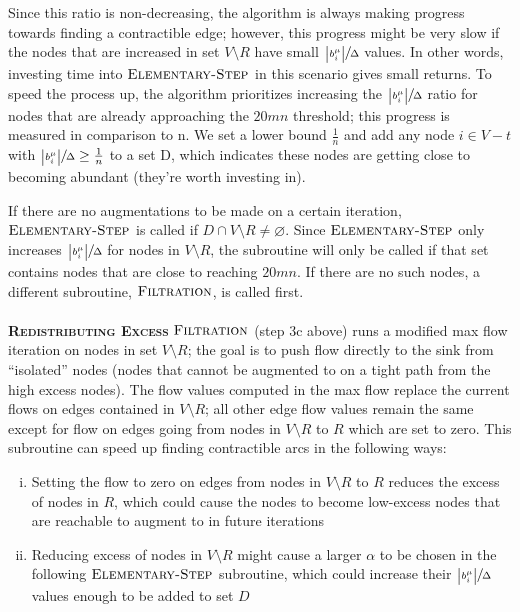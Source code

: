 \documentclass[11pt]{article}
\theoremstyle{definition}
\theoremstyle{definition}
\theoremstyle{definition}
\newcommand{\filtration}{\textsc{Filtration}}
\newcommand{\es}{\textsc{Elementary-Step}}
\begin{document}
Since this ratio is non-decreasing, the algorithm is always making progress towards finding a
contractible edge; however, this progress might be very slow if the nodes that are increased in set $V \setminus R$ have small $\sfrac{\abs{b_i^\mu}}{\Delta}$ values. In other words, investing time into $\es$ in this scenario gives small returns. To speed the process up, the algorithm prioritizes increasing the
$\sfrac{\abs{b_i^\mu}}{\Delta}$ ratio for nodes that are already approaching the
$20mn$ threshold; this progress is measured in comparison to n. We set a lower bound $\frac{1}{n}$ and add any node $i \in V-t$ with $\sfrac{\abs{b_i^\mu}}{\Delta} \geq \frac{1}{n}$ to a set D, which indicates these nodes are getting close to becoming abundant (they're worth investing in). 

If there are no augmentations to be made on a certain iteration, $\es$ is called
if $D \cap V\setminus R \neq \varnothing$. Since $\es$ only increases
$\sfrac{\abs{b_i^\mu}}{\Delta}$ for nodes in $V\setminus R$, the subroutine will
only be called if that set contains nodes that are close to reaching $20mn$. If
there are no such nodes, a different subroutine, $\filtration$, is called first. \\ \\
\textbf{\textsc{Redistributing Excess}} $\filtration$ (step 3c above) runs a modified max flow iteration on nodes in set $V \setminus R$;
the goal is to push flow directly to the sink from ``isolated'' nodes (nodes that cannot be augmented to on a tight path from the high excess nodes). The flow values computed in the max flow replace the current flows on
edges contained in $V \setminus R$; all other edge flow values remain the same
except for flow on edges going from nodes in $V \setminus R$  to $R$ which are set
to zero. This subroutine can speed up finding contractible arcs
in the following ways:

\begin{enumerate}[(i),itemsep=0mm]
\item Setting the flow to zero on edges from nodes in $V\setminus R$ to $R$
	reduces the excess of nodes in $R$, which could cause the nodes to become
	low-excess nodes that are reachable to augment to in future iterations
\item Reducing excess of nodes in $V \setminus R$ might cause a larger $\alpha$ to be chosen in the following $\es$ subroutine, which could increase their $\sfrac{\abs{b_i^\mu}}{\Delta}$ values enough to be added to set $D$
\end{enumerate}
\end{document}
